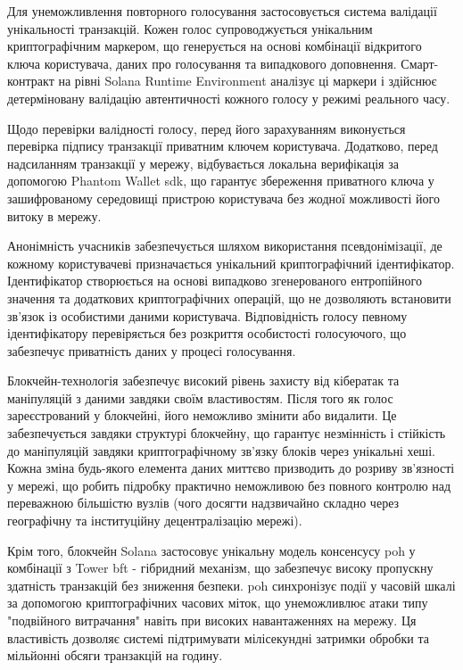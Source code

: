 \documentclass[14pt]{extreport}
\begin{document}
  Для унеможливлення повторного голосування застосовується система валідації унікальності транзакцій. Кожен голос супроводжується унікальним криптографічним маркером, що генерується на основі комбінації відкритого ключа користувача, даних про голосування та випадкового доповнення. Смарт-контракт на рівні Solana Runtime Environment аналізує ці маркери і здійснює детерміновану валідацію автентичності кожного голосу у режимі реального часу.

  Щодо перевірки валідності голосу, перед його зарахуванням виконується перевірка підпису транзакції приватним ключем користувача. Додатково, перед надсиланням транзакції у мережу, відбувається локальна верифікація за допомогою Phantom Wallet \gls{sdk}, що гарантує збереження приватного ключа у зашифрованому середовищі пристрою користувача без жодної можливості його витоку в мережу.

  Анонімність учасників забезпечується шляхом використання псевдонімізації, де кожному користувачеві призначається унікальний криптографічний ідентифікатор. Ідентифікатор створюється на основі випадково згенерованого ентропійного значення та додаткових криптографічних операцій, що не дозволяють встановити зв'язок із особистими даними користувача. Відповідність голосу певному ідентифікатору перевіряється без розкриття особистості голосуючого, що забезпечує приватність даних у процесі голосування.
  
  Блокчейн-технологія забезпечує високий рівень захисту від кібератак та маніпуляцій з даними завдяки своїм властивостям. Після того як голос зареєстрований у блокчейні, його неможливо змінити або видалити. Це забезпечується завдяки структурі блокчейну, що гарантує незмінність і стійкість до маніпуляцій завдяки криптографічному зв'язку блоків через унікальні хеші. Кожна зміна будь-якого елемента даних миттєво призводить до розриву зв'язності у мережі, що робить підробку практично неможливою без повного контролю над переважною більшістю вузлів (чого досягти надзвичайно складно через географічну та інституційну децентралізацію мережі).
  
  Крім того, блокчейн Solana застосовує унікальну модель консенсусу \gls{poh} у комбінації з Tower \gls{bft} - гібридний механізм, що забезпечує високу пропускну здатність транзакцій без зниження безпеки. \gls{poh} синхронізує події у часовій шкалі за допомогою криптографічних часових міток, що унеможливлює атаки типу "подвійного витрачання" навіть при високих навантаженнях на мережу. Ця властивість дозволяє системі підтримувати мілісекундні затримки обробки та мільйонні обсяги транзакцій на годину.
  
\end{document}
